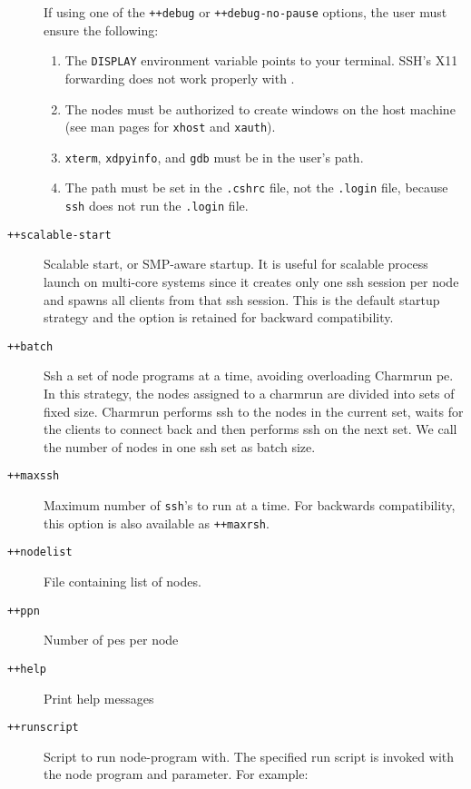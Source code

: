 \begin{description}
If using one of the {\tt ++debug} or {\tt ++debug-no-pause} options,
the user must ensure the following:
\begin{enumerate}

\item The {\tt DISPLAY} environment variable points to your terminal.
SSH's X11 forwarding does not work properly with \charmpp{}.

\item The nodes must be authorized to create windows on the host machine (see
man pages for {\tt xhost} and {\tt xauth}).

\item {\tt xterm}, {\tt xdpyinfo},  and {\tt gdb} must be in
the user's path.

\item The path must be set in the {\tt .cshrc} file, not the {\tt .login}
file, because {\tt ssh} does not run the {\tt .login} file.

\end{enumerate}

\item[{\tt ++scalable-start}]   Scalable start, or SMP-aware startup. It is useful for scalable process launch on multi-core systems since it creates only one ssh session per node and spawns all clients from that ssh session. This is the default startup strategy and the option is retained for backward compatibility.

\item[{\tt ++batch}]            Ssh a set of node programs at a time, avoiding overloading Charmrun pe.  In this strategy, the nodes assigned to a charmrun are divided into sets of fixed size. Charmrun performs ssh to the nodes in the current set, waits for the clients to connect back and then performs ssh on the next set. We call the number of nodes in one ssh set as batch size.

\item[{\tt ++maxssh}] Maximum number of {\tt ssh}'s to run at a
time. For backwards compatibility, this option is also available as {\tt ++maxrsh}.

\item[{\tt ++nodelist}] File containing list of nodes.


\item[{\tt ++ppn}]              Number of pes per node

\item[{\tt ++help}]             Print help messages

\item[{\tt ++runscript}]        Script to run node-program with. The specified run script is invoked with the node program and parameter. For example:


\end{description}
